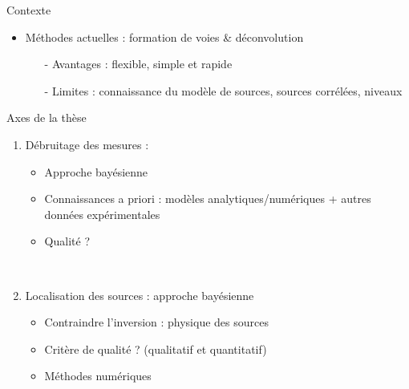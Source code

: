 \begin{frame}{Contexte}
\begin{itemize}
\begin{itemize}
					\item[-]  mesures empreintes de bruit aérodynamique (en vol et en soufflerie)
				\end{itemize}~\\
			\item Méthodes actuelles : formation de voies \& déconvolution
				\begin{itemize}
					\item[-]  Avantages : flexible, simple et rapide
					\item[-]  Limites : connaissance du modèle de sources, sources corrélées, niveaux
				\end{itemize}
		\end{itemize}
	
\end{frame}


\begin{frame}{Axes de la thèse}
	\begin{enumerate}
		\item Débruitage des mesures : \\
			\begin{itemize}
				\item Approche bayésienne
				\item Connaissances a priori : modèles analytiques/numériques + autres données expérimentales
				\item Qualité ?
			\end{itemize}~\\
		\item Localisation des sources : approche bayésienne
			\begin{itemize}
				\item Contraindre l'inversion : physique des sources
				\item Critère de qualité ? (qualitatif et quantitatif)
				\item Méthodes numériques
			\end{itemize}
	\end{enumerate}
\end{frame}


